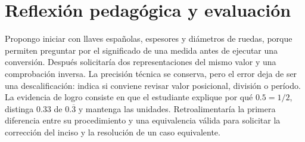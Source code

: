 \documentclass[spanish,letterpaper,oneside]{article}
\begin{document}
\section{Reflexión pedagógica y evaluación}
Propongo iniciar con llaves españolas, espesores y diámetros de ruedas, porque permiten preguntar por el significado de una medida antes de ejecutar una conversión. Después solicitaría dos representaciones del mismo valor y una comprobación inversa. La precisión técnica se conserva, pero el error deja de ser una descalificación: indica si conviene revisar valor posicional, división o período.
La evidencia de logro consiste en que el estudiante explique por qué $0.5=1/2$, distinga $0.33$ de $0.\overline3$ y mantenga las unidades. Retroalimentaría la primera diferencia entre su procedimiento y una equivalencia válida para solicitar la corrección del inciso y la resolución de un caso equivalente.
\end{document}
